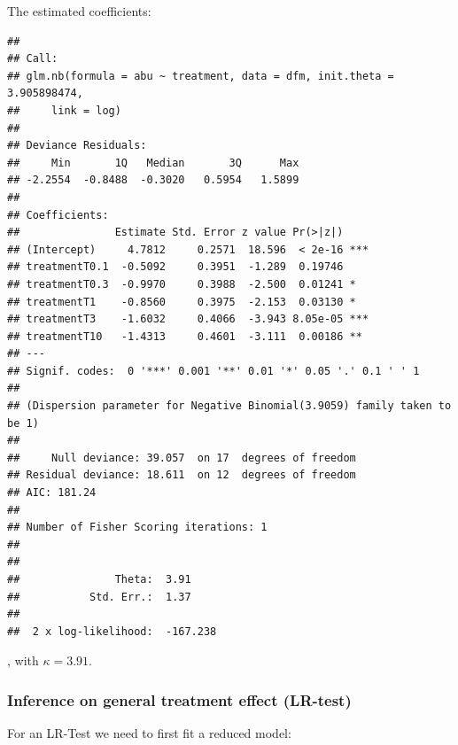 The estimated coefficients:
\begin{knitrout}
\color{fgcolor}\begin{kframe}
\begin{alltt}
\end{alltt}
\begin{verbatim}
## 
## Call:
## glm.nb(formula = abu ~ treatment, data = dfm, init.theta = 3.905898474, 
##     link = log)
## 
## Deviance Residuals: 
##     Min       1Q   Median       3Q      Max  
## -2.2554  -0.8488  -0.3020   0.5954   1.5899  
## 
## Coefficients:
##               Estimate Std. Error z value Pr(>|z|)    
## (Intercept)     4.7812     0.2571  18.596  < 2e-16 ***
## treatmentT0.1  -0.5092     0.3951  -1.289  0.19746    
## treatmentT0.3  -0.9970     0.3988  -2.500  0.01241 *  
## treatmentT1    -0.8560     0.3975  -2.153  0.03130 *  
## treatmentT3    -1.6032     0.4066  -3.943 8.05e-05 ***
## treatmentT10   -1.4313     0.4601  -3.111  0.00186 ** 
## ---
## Signif. codes:  0 '***' 0.001 '**' 0.01 '*' 0.05 '.' 0.1 ' ' 1
## 
## (Dispersion parameter for Negative Binomial(3.9059) family taken to be 1)
## 
##     Null deviance: 39.057  on 17  degrees of freedom
## Residual deviance: 18.611  on 12  degrees of freedom
## AIC: 181.24
## 
## Number of Fisher Scoring iterations: 1
## 
## 
##               Theta:  3.91 
##           Std. Err.:  1.37 
## 
##  2 x log-likelihood:  -167.238
\end{verbatim}
\end{kframe}
\end{knitrout}
, with $\kappa = 3.91$.


\subsubsection{Inference on general treatment effect (LR-test)}
For an LR-Test we need to first fit a reduced model:
\begin{knitrout}
\color{fgcolor}\begin{kframe}
\begin{alltt}
 \hlkwb{<-}  \hlopt{~} \hlstd{,}  
\end{alltt}
\end{kframe}
\end{knitrout}

